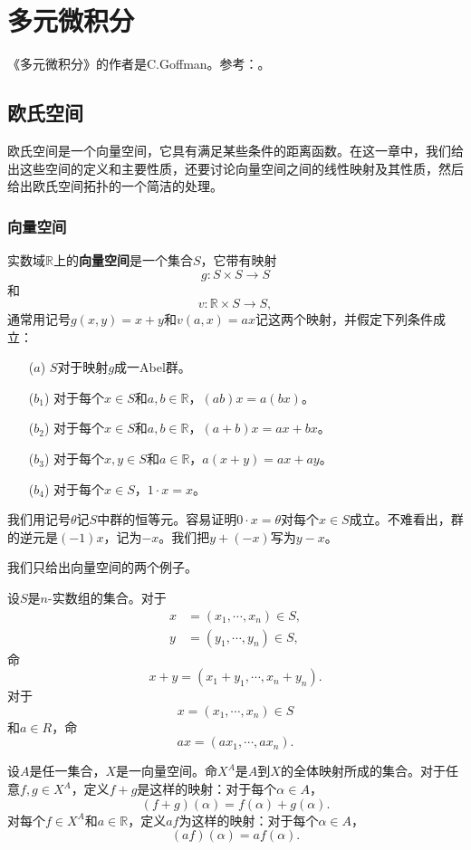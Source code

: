 \part{多元微积分}
《多元微积分》的作者是C.Goffman。参考：\cite{CalculusOfMultiVariables1978}。

\chapter{欧氏空间}\label{section00301}
欧氏空间是一个向量空间，它具有满足某些条件的距离函数。在这一章中，我们给出这些空间的定义和主要性质，还要讨论向量空间之间的线性映射及其性质，然后给出欧氏空间拓扑的一个简洁的处理。


\section{向量空间}\label{subsection0030101}
实数域$\mathbb{R}$上的\textbf{向量空间}是一个集合$S$，它带有映射
\[
g: S \times S \to S
\]
和
\[
v: \mathbb{R} \times S \to S,
\]
通常用记号$g(x,y) = x+y$和$v(a,x)=ax$记这两个映射，并假定下列条件成立：
\begin{enumerate}
\item[($a$)] $S$对于映射$g$成一Abel群。
\item[($b_1$)]对于每个$x \in S$和$a, b \in \mathbb{R}$，$(ab)x = a(bx)$。
\item[($b_2$)]对于每个$x \in S$和$a, b \in \mathbb{R}$，$(a+b)x=ax+bx$。
\item[($b_3$)]对于每个$x, y \in S$和$a \in \mathbb{R}$，$a(x+y)=ax+ay$。
\item[($b_4$)]对于每个$x \in S$，$1 \cdot x = x$。
\end{enumerate}

我们用记号$\theta$记$S$中群的恒等元。容易证明$0 \cdot x = \theta$对每个$x \in S$成立。不难看出，群的逆元是$(-1)x$，记为$-x$。我们把$y+(-x)$写为$y-x$。

我们只给出向量空间的两个例子。
\begin{example}
设$S$是$n$-实数组的集合。对于
\[
\begin{aligned}
x &= (x_1, \cdots, x_n) \in S,\\
y &= (y_1, \cdots, y_n) \in S,
\end{aligned}
\]
命
\[
x+y = (x_1+y_1, \cdots, x_n+y_n).
\]
对于
\[
x = (x_1, \cdots, x_n) \in S
\]
和$a \in R$，命
\[
ax = (ax_1, \cdots, ax_n).
\]
\end{example}

\begin{example}
设$A$是任一集合，$X$是一向量空间。命$X^A$是$A$到$X$的全体映射所成的集合。对于任意$f, g \in X^A$，定义$f+g$是这样的映射：对于每个$\alpha \in A$，
\[
(f+g)(\alpha)  = f(\alpha)+g(\alpha).
\]
对每个$f \in X^A$和$a \in \mathbb{R}$，定义$af$为这样的映射：对于每个$\alpha \in A$，
\[
(af)(\alpha) = af(\alpha).
\]
\end{example}

